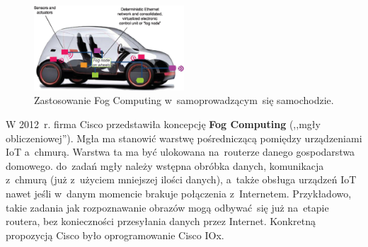 \documentclass[12pt,a4paper,twoside,titlepage,openright]{book}
\begin{document}
\begin{figure}[h]
	\centering
			\includegraphics[width=0.5\textwidth]{fog-samochod.png}
		\caption{Zastosowanie Fog Computing w~samoprowadzącym~się samochodzie. \cite{fog5g}}
		\label{fig:fog-samochod}
\end{figure}

W 2012~r. firma Cisco przedstawiła koncepcję \textbf{Fog Computing} (,,mgły obliczeniowej''). Mgła ma stanowić warstwę pośredniczącą pomiędzy urządzeniami IoT a~chmurą. Warstwa ta ma być ulokowana na~routerze danego gospodarstwa domowego. do~zadań mgły należy wstępna obróbka danych, komunikacja z~chmurą (już z~użyciem mniejszej ilości danych), a~także obsługa urządzeń IoT nawet jeśli w~danym momencie brakuje połączenia z~Internetem. Przykładowo, takie zadania jak rozpoznawanie obrazów mogą odbywać~się już na~etapie routera, bez konieczności przesyłania danych przez Internet. Konkretną propozycją Cisco było oprogramowanie Cisco IOx. \cite{fogArticle, iotArchitects}
\end{document}
